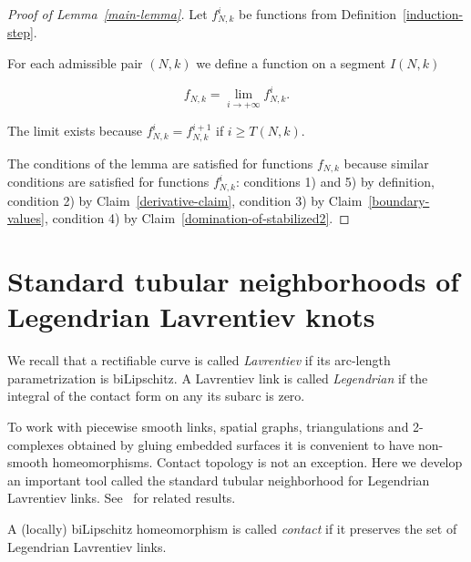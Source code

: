 \documentclass[12pt]{article}
\theoremstyle{definition}
\begin{document}
\begin{proof}[Proof of Lemma~\ref{main-lemma}]
Let $f_{N,k}^i$ be functions from Definition~\ref{induction-step}.

For each admissible pair $(N,k)$ we define a function on a segment $I(N,k)$

$$
f_{N,k} = \lim\limits_{i\to+\infty} f_{N,k}^i.
$$

The limit exists because $f_{N,k}^i = f_{N,k}^{i+1}$ if $i\ge T(N,k).$

The conditions of the lemma are satisfied for functions $f_{N,k}$ because similar conditions are satisfied for functions $f_{N,k}^i$: conditions 1) and 5) by definition, condition 2) by Claim~\ref{derivative-claim}, condition 3) by Claim~\ref{boundary-values}, condition 4) by Claim~\ref{domination-of-stabilized2}.
\end{proof}

\section{Standard tubular neighborhoods of Legendrian Lavrentiev knots}
\label{contact-section}

We recall that a rectifiable curve is called {\it Lavrentiev} if its arc-length parametrization is biLipschitz. A Lavrentiev link is called {\it Legendrian} if the integral of the contact form on any its subarc is zero.

To work with piecewise smooth links, spatial graphs, triangulations and 2-complexes obtained by gluing embedded surfaces it is convenient to have non-smooth homeomorphisms. Contact topology is not an exception. Here we develop an important tool called the standard tubular neighborhood for Legendrian Lavrentiev links. See~\cite{Pra, Pra2} for related results.

A (locally) biLipschitz homeomorphism is called {\it contact} if it preserves the set of Legendrian Lavrentiev links.
\end{document}
